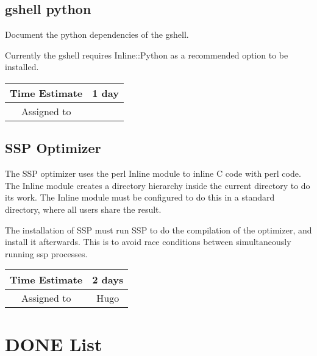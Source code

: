 \documentclass[12pt]{article}
\begin{document}
\subsection{gshell python}

Document the python dependencies of the gshell.

Currently the gshell requires Inline::Python as a recommended option
to be installed.

\begin{center}
  \vspace{5mm}
  \centering
  \begin{tabular}{|c|c|}
    \hline
    Time Estimate
    & 1 day \\
    \hline
    Assigned to
    & \\
    \hline
  \end{tabular}
\end{center}


\subsection{SSP Optimizer}

The SSP optimizer uses the perl Inline module to inline C code with
perl code.  The Inline module creates a directory hierarchy inside the
current directory to do its work.  The Inline module must be
configured to do this in a standard directory, where all users share
the result.

The installation of SSP must run SSP to do the compilation of the
optimizer, and install it afterwards.  This is to avoid race
conditions between simultaneously running ssp processes.

\begin{center}
  \vspace{5mm}
  \centering
  \begin{tabular}{|c|c|}
    \hline
    Time Estimate
    & 2 days \\
    \hline
    Assigned to
    & Hugo \\
    \hline
  \end{tabular}
\end{center}


\section{DONE List}
\end{document}
